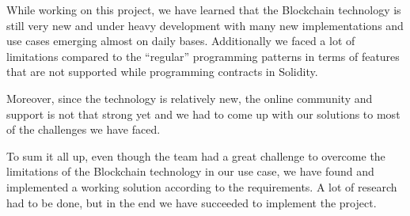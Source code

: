 While working on this project, we have learned that the Blockchain technology is still very new and under heavy development with many new implementations and use cases emerging almost on daily bases. Additionally we faced a lot of limitations compared to the “regular” programming patterns in terms of features that are not supported while programming contracts in Solidity.

Moreover, since the technology is relatively new, the online community and support is not that strong yet and we had to come up with our solutions to most of the challenges we have faced.

To sum it all up, even though the team had a great challenge to overcome the limitations of the Blockchain technology in  our use case, we have found and implemented a working solution according to the requirements. A lot of research had to be done, but in the end we have succeeded to implement the project.
